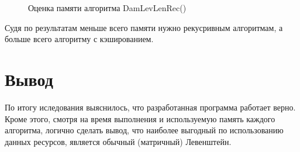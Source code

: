 \begin{figure}
	\caption{Оценка памяти алгоритма DamLevLenRec()}
\end{figure}

\newpage
Судя по результатам меньше всего памяти нужно рекусривным алгоритмам, а больше всего алгоритму с кэшированием.

\section{Вывод}
По итогу иследования выяснилось, что разработанная программа работает верно. Кроме этого, смотря на время выполнения и используемую память каждого алгоритма, логично сделать вывод, что наиболее выгодный по использованию данных ресурсов, является обычный (матричный) Левенштейн.